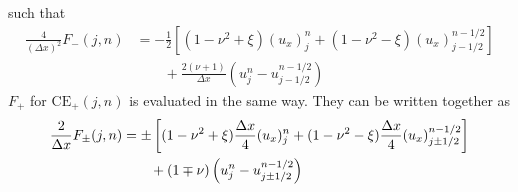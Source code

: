 \documentclass[11pt,dvips]{article}
\numberwithin{equation}{section}
\begin{document}
such that
\begin{align*}
  \frac{4}{(\Delta x)^2}F_-(j,n) &=
    -\frac{1}{2}\left[
      (1-\nu^2+\xi)(u_x)_j^n + (1-\nu^2-\xi)(u_x)_{j-1/2}^{n-1/2}
    \right] \\
  &\quad\quad
  + \frac{2(\nu+1)}{\Delta x}\left(u_j^n-u_{j-1/2}^{n-1/2}\right)
\end{align*}
$F_+$ for $\mathrm{CE}_+(j,n)$ is evaluated in the same way.  They can be
written together as
\begin{align}
  \frac{2}{\Delta x}F_{\pm}(j,n) &=
    \pm\left[
        (1-\nu^2+\xi)\frac{\Delta x}{4}(u_x)_j^n
      + (1-\nu^2-\xi)\frac{\Delta x}{4}(u_x)_{j\pm1/2}^{n-1/2}
    \right] \notag \\
  &\quad\quad
  + (1\mp\nu)\left(u_j^n-u_{j\pm1/2}^{n-1/2}\right)
    \label{e:both_conserv_func}
\end{align}
\end{document}
